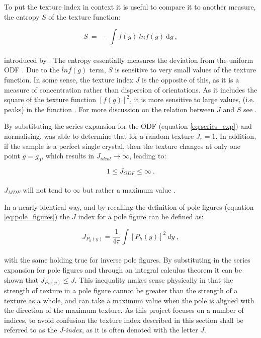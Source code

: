 \documentclass[a4paper,12pt,twoside]{report}
\numberwithin{equation}{chapter}
\begin{document}
To put the texture index in context it is useful to compare it to another measure, the entropy $S$ of the texture function:

\begin{equation}
S\ =\ -\int f(g)\ ln f(g)\ \mathrm{d}g\ ,
\end{equation}
\\
introduced by \cite{Schaeben1988}. The entropy essentially measures the deviation from the uniform ODF \citep[lack of \lq{}organisation\rq{} of orientations,][]{Hielscher2007}. Due to the $ln f(g)$ term, $S$ is sensitive to very small values of the texture function. In some sense, the texture index $J$ is the opposite of this, as it is a measure of concentration rather than dispersion of orientations. As it includes the square of the texture function $[f(g)]^2$, it is more sensitive to large values, (i.e. peaks) in the function \citep{Mainprice}. For more discussion on the relation between $J$ and $S$ see \cite{Hielscher2007}. 

By substituting the series expansion for the ODF (equation \ref{eq:series_exp})  and normalising, \cite{bunge1982texture} was able to determine that for a random texture $J_r = 1$. In addition, if the sample is a perfect single crystal, then the texture changes at only one point $g = g_0$, which results in $J_{ideal} \to \infty$, leading to:

\begin{equation}
1 \leq J_{ODF} \leq \infty\ .
\end{equation}
\\
$J_{MDF}$ will not tend to $\infty$ but rather a maximum value \citep{Mainprice}.

In a nearly identical way, and by recalling the definition of pole figures (equation \ref{eq:pole_figures}) the $J$ index for a pole figure can be defined as:
 
\begin{equation}
J_{P_h(y)} = \frac{1}{4\pi} \int [ P_{h}(y) ]^2\ dy\ ,
\end{equation}
\\
with the same holding true for inverse pole figures. By substituting in the series expansion for pole figures and through an integral calculus theorem \citep[p.90]{bunge1982texture} it can be shown that $J_{P_h(y)} \leq J$. This inequality makes sense physically in that the strength of texture in a pole figure cannot be greater than the strength of a texture as a whole, and can take a maximum value when the pole is aligned with the direction of the maximum texture. As this project focuses on a number of indices, to avoid confusion the texture index described in this section shall be referred to as the \emph{J-index}, as it is often denoted with the letter $J$.
\end{document}
